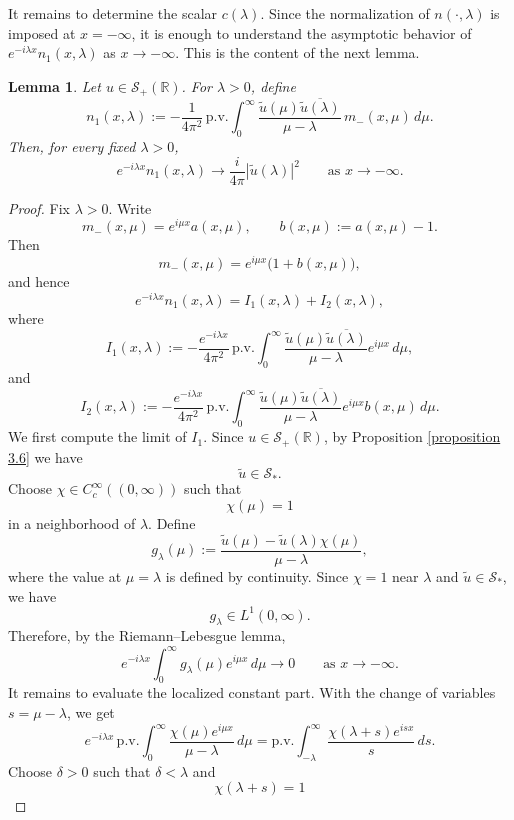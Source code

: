 \documentclass[10pt]{article}
\newtheorem{lemma}[theorem]{Lemma}
\numberwithin{equation}{section}
\numberwithin{theorem}{section}
\begin{document}
It remains to determine the scalar \(c(\lambda)\). Since the normalization of
\(n(\cdot,\lambda)\) is imposed at \(x=-\infty\), it is enough to understand the
asymptotic behavior of \(e^{-i\lambda x}n_1(x,\lambda)\) as \(x\to-\infty\). This is the content of the next lemma.
\begin{lemma}
\label{lemma 3.8}
Let \(u\in\mathcal S_+(\mathbb R)\). For \(\lambda>0\), define
\[
n_1(x,\lambda)
:=
-\frac{1}{4\pi^2}\,
\mathrm{p.v.}\int_0^\infty
\frac{\widetilde u(\mu)\overline{\widetilde u(\lambda)}}{\mu-\lambda}
\,m_-(x,\mu)\,d\mu .
\]
Then, for every fixed \(\lambda>0\),
\[
e^{-i\lambda x}n_1(x,\lambda)
\longrightarrow
\frac{i}{4\pi}|\widetilde u(\lambda)|^2
\qquad\text{as }x\to-\infty .
\]
\end{lemma}
\begin{proof}
Fix \(\lambda>0\). Write
\[
m_-(x,\mu)=e^{i\mu x}a(x,\mu),
\qquad
b(x,\mu):=a(x,\mu)-1.
\]
Then
\[
m_-(x,\mu)=e^{i\mu x}\bigl(1+b(x,\mu)\bigr),
\]
and hence
\[
e^{-i\lambda x}n_1(x,\lambda)
=
I_1(x,\lambda)+I_2(x,\lambda),
\]
where
\[
I_1(x,\lambda)
:=
-\frac{e^{-i\lambda x}}{4\pi^2}
\,\mathrm{p.v.}\int_0^\infty
\frac{\widetilde u(\mu)\overline{\widetilde u(\lambda)}}{\mu-\lambda}
e^{i\mu x}\,d\mu ,
\]
and
\[
I_2(x,\lambda)
:=
-\frac{e^{-i\lambda x}}{4\pi^2}
\,\mathrm{p.v.}\int_0^\infty
\frac{\widetilde u(\mu)\overline{\widetilde u(\lambda)}}{\mu-\lambda}
e^{i\mu x}b(x,\mu)\,d\mu .
\]
We first compute the limit of \(I_1\). Since \(u\in\mathcal S_+(\mathbb R)\), by
Proposition \ref{proposition 3.6} we have
\[
\widetilde u\in\mathcal S_* .
\]
Choose \(\chi\in C_c^\infty((0,\infty))\) such that
\[
\chi(\mu)=1
\]
in a neighborhood of \(\lambda\). Define
\[
g_\lambda(\mu)
:=
\frac{\widetilde u(\mu)-\widetilde u(\lambda)\chi(\mu)}{\mu-\lambda},
\]
where the value at \(\mu=\lambda\) is defined by continuity. Since \(\chi=1\) near
\(\lambda\) and \(\widetilde u\in\mathcal S_*\), we have
\[
g_\lambda\in L^1(0,\infty).
\]
Therefore, by the Riemann--Lebesgue lemma,
\begin{equation}
\label{3.8.1}
e^{-i\lambda x}
\int_0^\infty g_\lambda(\mu)e^{i\mu x}\,d\mu
\longrightarrow0
\qquad\text{as }x\to-\infty .
\end{equation}
It remains to evaluate the localized constant part. With the change of variables
\(s=\mu-\lambda\), we get
\[
e^{-i\lambda x}
\,\mathrm{p.v.}\int_0^\infty
\frac{\chi(\mu)e^{i\mu x}}{\mu-\lambda}\,d\mu
=
\mathrm{p.v.}\int_{-\lambda}^{\infty}
\frac{\chi(\lambda+s)e^{isx}}{s}\,ds .
\]
Choose \(\delta>0\) such that \(\delta<\lambda\) and
\[
\chi(\lambda+s)=1
\]
\end{proof}
\end{document}
